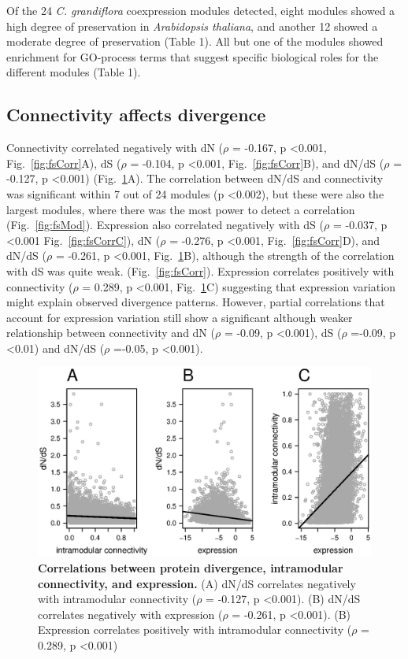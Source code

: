 Of the 24 \textit{C. grandiflora} coexpression modules detected, eight modules showed a high degree of preservation in \textit{Arabidopsis thaliana}, and another 12 showed a moderate degree of preservation (Table 1). All but one of the modules showed enrichment for GO-process terms that suggest specific biological roles for the different modules (Table 1).

\subsection{Connectivity affects divergence}
Connectivity correlated negatively with  dN ($\rho$ = -0.167, p \textless 0.001,  Fig.~\ref{fig:fsCorr}A), dS ($\rho$ = -0.104, p \textless 0.001, Fig.~\ref{fig:fsCorr}B), and dN/dS ($\rho$ = -0.127, p \textless 0.001) (Fig.~\ref{fig:f1}A). The correlation between dN/dS and connectivity was significant within 7 out of 24 modules (p \textless 0.002), but these were also the largest modules, where there was the most power to detect a correlation (Fig.~\ref{fig:fsMod}). Expression also correlated negatively with dS ($\rho$ = -0.037, p \textless 0.001 Fig.~\ref{fig:fsCorrC}), dN ($\rho$ = -0.276, p \textless 0.001, Fig.~\ref{fig:fsCorr}D), and dN/dS ($\rho$ = -0.261, p \textless 0.001, Fig.~\ref{fig:f1}B),  although the strength of the correlation with dS was quite weak. (Fig.~\ref{fig:fsCorr}). Expression correlates positively with connectivity ($\rho$ = 0.289, p \textless 0.001, Fig.~\ref{fig:f1}C) suggesting that expression variation might explain observed divergence patterns. However, partial correlations that account for expression variation still show a significant although weaker relationship between connectivity and dN ($\rho$ = -0.09, p \textless 0.001), dS ($\rho$ =-0.09, p \textless 0.01) and dN/dS ($\rho$ =-0.05, p \textless 0.001). 

\begin{figure}[ht!]
\centering
\includegraphics[width=\linewidth]{Ch4Fig1}
\caption{\textbf{Correlations between protein divergence, intramodular connectivity, and expression.} (A) dN/dS correlates negatively with intramodular connectivity ($\rho$ = -0.127, p \textless 0.001). (B) dN/dS correlates negatively with expression ($\rho$ = -0.261, p \textless 0.001). (B) Expression correlates positively with intramodular connectivity ($\rho$ = 0.289, p \textless 0.001)}
\label{fig:f1}
\end{figure}

